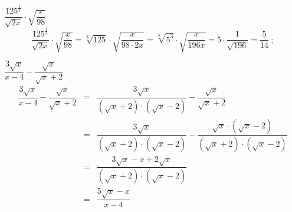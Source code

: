  \begin{exem}
  $\dfrac{125^{\frac{1}{3}}}{\sqrt{2x}} \cdot \sqrt{\dfrac{x}{98}}$
\begin{equation*}
\dfrac{125^{\frac{1}{3}}}{\sqrt{2x}} \cdot \sqrt{\dfrac{x}{98}}= \sqrt[3]{125} \cdot \sqrt{\dfrac{x}{98 \cdot 2x}}= \sqrt[3]{5^3} \cdot \sqrt{\dfrac{x}{196x}}= 5 \cdot \dfrac{1}{\sqrt{196}}= \dfrac{5}{14} \ ;
\end{equation*}
   \end{exem}
 
 \begin{exem}
   $\dfrac{3\sqrt{x}}{x-4} - \dfrac{\sqrt{x}}{\sqrt{x}+2}$
   \begin{eqnarray*}
    \dfrac{3\sqrt{x}}{x-4} - \dfrac{\sqrt{x}}{\sqrt{x}+2} &=& \dfrac{3\sqrt{x}}{(\sqrt{x}+2) \cdot (\sqrt{x}-2)} - \dfrac{\sqrt{x}}{\sqrt{x}+2} \\
    &=& \dfrac{3\sqrt{x}}{(\sqrt{x}+2) \cdot (\sqrt{x}-2)} - \dfrac{\sqrt{x} \cdot (\sqrt{x}-2)}{(\sqrt{x}+2) \cdot (\sqrt{x}-2)} \\
    &=& \dfrac{3\sqrt{x} - x + 2\sqrt{x}}{(\sqrt{x}+2) \cdot (\sqrt{x}-2)} \\
    &=& \dfrac{5\sqrt{x} - x}{x-4}
   \end{eqnarray*}
 \end{exem}
 
